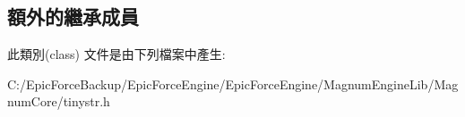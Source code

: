 \subsection*{額外的繼承成員}


此類別(class) 文件是由下列檔案中產生\+:\begin{DoxyCompactItemize}
\item 
C\+:/\+Epic\+Force\+Backup/\+Epic\+Force\+Engine/\+Epic\+Force\+Engine/\+Magnum\+Engine\+Lib/\+Magnum\+Core/tinystr.\+h\end{DoxyCompactItemize}
